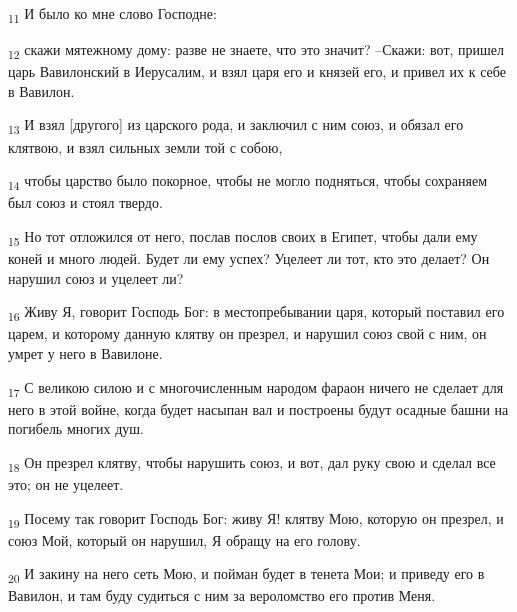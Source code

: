 \begin{tcolorbox}
\textsubscript{11} И было ко мне слово Господне:
\end{tcolorbox}
\begin{tcolorbox}
\textsubscript{12} скажи мятежному дому: разве не знаете, что это значит? --Скажи: вот, пришел царь Вавилонский в Иерусалим, и взял царя его и князей его, и привел их к себе в Вавилон.
\end{tcolorbox}
\begin{tcolorbox}
\textsubscript{13} И взял [другого] из царского рода, и заключил с ним союз, и обязал его клятвою, и взял сильных земли той с собою,
\end{tcolorbox}
\begin{tcolorbox}
\textsubscript{14} чтобы царство было покорное, чтобы не могло подняться, чтобы сохраняем был союз и стоял твердо.
\end{tcolorbox}
\begin{tcolorbox}
\textsubscript{15} Но тот отложился от него, послав послов своих в Египет, чтобы дали ему коней и много людей. Будет ли ему успех? Уцелеет ли тот, кто это делает? Он нарушил союз и уцелеет ли?
\end{tcolorbox}
\begin{tcolorbox}
\textsubscript{16} Живу Я, говорит Господь Бог: в местопребывании царя, который поставил его царем, и которому данную клятву он презрел, и нарушил союз свой с ним, он умрет у него в Вавилоне.
\end{tcolorbox}
\begin{tcolorbox}
\textsubscript{17} С великою силою и с многочисленным народом фараон ничего не сделает для него в этой войне, когда будет насыпан вал и построены будут осадные башни на погибель многих душ.
\end{tcolorbox}
\begin{tcolorbox}
\textsubscript{18} Он презрел клятву, чтобы нарушить союз, и вот, дал руку свою и сделал все это; он не уцелеет.
\end{tcolorbox}
\begin{tcolorbox}
\textsubscript{19} Посему так говорит Господь Бог: живу Я! клятву Мою, которую он презрел, и союз Мой, который он нарушил, Я обращу на его голову.
\end{tcolorbox}
\begin{tcolorbox}
\textsubscript{20} И закину на него сеть Мою, и пойман будет в тенета Мои; и приведу его в Вавилон, и там буду судиться с ним за вероломство его против Меня.
\end{tcolorbox}
